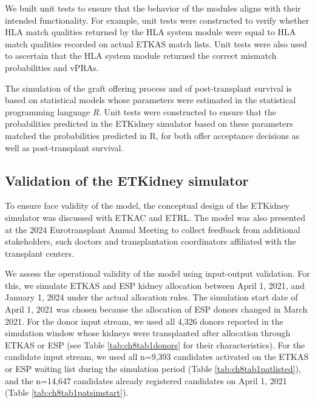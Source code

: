 \documentclass[11pt,twoside,]{book}
\begin{document}
We built unit tests to ensure that the behavior of the modules aligns
with their intended functionality. For example, unit tests were
constructed to verify whether HLA match qualities returned by the HLA
system module were equal to HLA match qualities recorded on actual ETKAS match lists.
Unit tests were also used to ascertain that the HLA system module
returned the correct mismatch probabilities and vPRAs.

The simulation of the graft offering process and of post-transplant survival
is based on statistical models whose parameters were estimated in the statistical
programming language \emph{R}. Unit tests were constructed to ensure that the
probabilities predicted in the ETKidney simulator based on these parameters matched
the probabilities predicted in R, for both offer acceptance
decisions as well as post-transplant survival.
\vfill
\newpage

\subsection{Validation of the ETKidney simulator}\label{sec:etkidneyvalidation}

To ensure face validity of the model, the conceptual design of the ETKidney simulator
was discussed with ETKAC and ETRL. The model was also presented at the 2024 Eurotransplant
Annual Meeting to collect feedback from additional stakeholders, such doctors
and transplantation coordinators affiliated with the transplant centers.

We assess the operational validity of the model using input-output validation.
For this, we simulate ETKAS and ESP kidney
allocation between April 1, 2021, and January 1, 2024 under the actual allocation
rules. The simulation start date of April 1, 2021
was chosen because the allocation of ESP donors changed in March 2021.
For the donor input stream, we
used all 4,326 donors reported in the simulation window
whose kidneys were transplanted after allocation through ETKAS or ESP (see Table \ref{tab:ch8tab1donors}
for their characteristics). For the candidate input stream, we used all
n=9,393 candidates activated on the ETKAS or ESP waiting list during the
simulation period (Table \ref{tab:ch8tab1patlisted}), and the n=14,647
candidates already registered candidates on April 1, 2021
(Table \ref{tab:ch8tab1patsimstart}).
\end{document}
